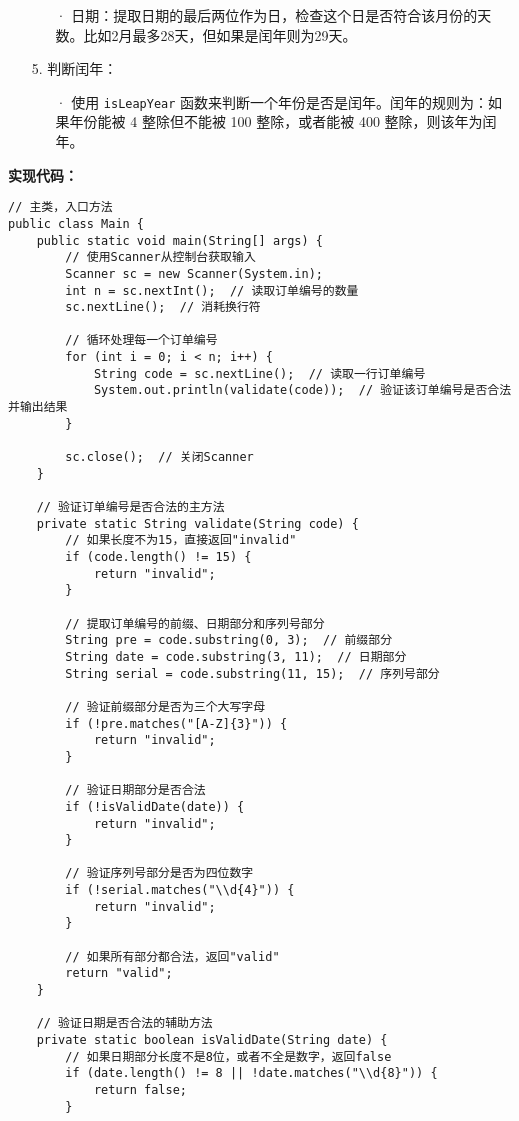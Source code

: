 \documentclass[a4paper]{ctexart}
\begin{document}
\begin{itemize}
\begin{itemize}
		\item[·] 日期：提取日期的最后两位作为日，检查这个日是否符合该月份的天数。比如2月最多28天，但如果是闰年则为29天。
	\end{itemize}
	
	\item[5.] 判断闰年：
	\begin{itemize}
		\item[·] 使用 \texttt{isLeapYear} 函数来判断一个年份是否是闰年。闰年的规则为：如果年份能被 4 整除但不能被 100 整除，或者能被 400 整除，则该年为闰年。
	\end{itemize}
	
\end{itemize}	
	
\noindent\textbf{实现代码：}
	
\begin{lstlisting}
// 主类，入口方法
public class Main {
	public static void main(String[] args) {
		// 使用Scanner从控制台获取输入
		Scanner sc = new Scanner(System.in);
		int n = sc.nextInt();  // 读取订单编号的数量
		sc.nextLine();  // 消耗换行符
		
		// 循环处理每一个订单编号
		for (int i = 0; i < n; i++) {
			String code = sc.nextLine();  // 读取一行订单编号
			System.out.println(validate(code));  // 验证该订单编号是否合法并输出结果
		}
		
		sc.close();  // 关闭Scanner
	}
	
	// 验证订单编号是否合法的主方法
	private static String validate(String code) {
		// 如果长度不为15，直接返回"invalid"
		if (code.length() != 15) {
			return "invalid";
		}
		
		// 提取订单编号的前缀、日期部分和序列号部分
		String pre = code.substring(0, 3);  // 前缀部分
		String date = code.substring(3, 11);  // 日期部分
		String serial = code.substring(11, 15);  // 序列号部分
		
		// 验证前缀部分是否为三个大写字母
		if (!pre.matches("[A-Z]{3}")) {
			return "invalid";
		}
		
		// 验证日期部分是否合法
		if (!isValidDate(date)) {
			return "invalid";
		}
		
		// 验证序列号部分是否为四位数字
		if (!serial.matches("\\d{4}")) {
			return "invalid";
		}
		
		// 如果所有部分都合法，返回"valid"
		return "valid";
	}
	
	// 验证日期是否合法的辅助方法
	private static boolean isValidDate(String date) {
		// 如果日期部分长度不是8位，或者不全是数字，返回false
		if (date.length() != 8 || !date.matches("\\d{8}")) {
			return false;
		}
		

\end{lstlisting}
\end{document}
